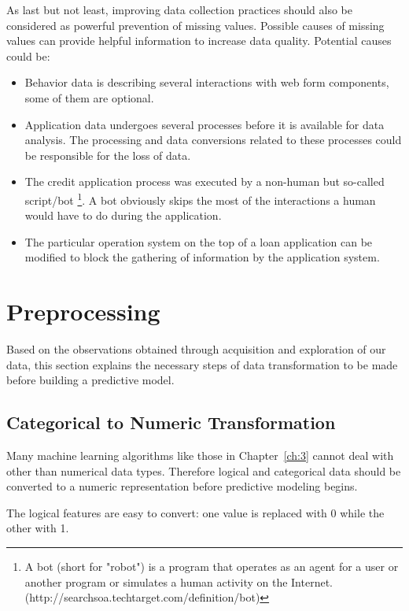 As last but not least, improving data collection practices should also be considered as powerful prevention of missing values. Possible causes of missing values can provide helpful information to increase data quality. 
Potential causes could be:
    \begin{itemize}
    
        \item Behavior data is describing several interactions with web form components, some of them are optional.
        
        \item Application data undergoes several processes before it is available for data analysis. The processing and data conversions related to these processes could be responsible for the loss of data.
        
        \item The credit application process was executed by a non-human but so-called script/bot \footnote{A bot (short for "robot") is a program that operates as an agent for a user or another program or simulates a human activity on the Internet. (http://searchsoa.techtarget.com/definition/bot)}. A bot obviously skips the most of the interactions a human would have to do during the application. 
    
        \item The particular operation system on the top of a loan application can be modified to block the gathering of information by the application system.
    \end{itemize}

\section{Preprocessing}\label{Ch:2:Preprocessing}
Based on the observations obtained through acquisition and exploration of our data, this section explains the necessary steps of data transformation to be made before building a predictive model.

\subsection{Categorical to Numeric Transformation}
\label{Ch:2:CTNT}
Many machine learning algorithms like those in Chapter~\ref{ch:3} cannot deal with other than numerical data types. Therefore logical and categorical data should be converted to a numeric representation before predictive modeling begins. 

The logical features are easy to convert: one value is replaced with 0 while the other with 1.

